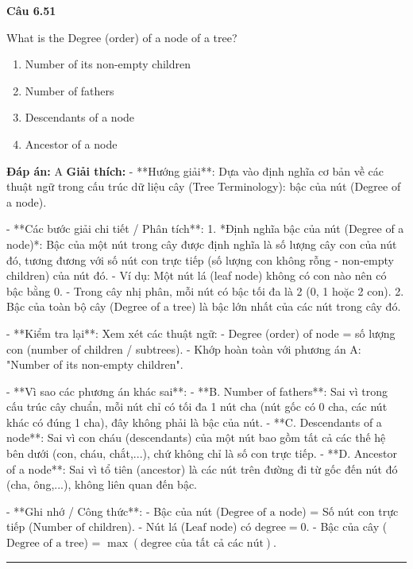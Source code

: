 \documentclass[11pt,a4paper]{article}
\newenvironment{question}[1]{%
  \par\vspace{1em}\noindent\textbf{\large Câu #1}\par\vspace{0.4em}
}{%
  \par\vspace{1em}\hrule\vspace{0.6em}
}
\newenvironment{choices}{%
  \begin{enumerate}[label=\textbf{\Alph*.},leftmargin=2.2em,itemsep=2pt,topsep=3pt]
}{%
  \end{enumerate}
}
\newcommand{\choice}{\item}
\begin{document}
\begin{question}{6.51}
What is the Degree (order) of a node of a tree?
\begin{choices}
\choice Number of its non-empty children
\choice Number of fathers
\choice Descendants of a node
\choice Ancestor of a node
\end{choices}
\textbf{Đáp án:} A
\textbf{Giải thích:} - **Hướng giải**:
  Dựa vào định nghĩa cơ bản về các thuật ngữ trong cấu trúc dữ liệu cây (Tree Terminology): bậc của nút (Degree of a node).

- **Các bước giải chi tiết / Phân tích**:
  1. *Định nghĩa bậc của nút (Degree of a node)*: Bậc của một nút trong cây được định nghĩa là số lượng cây con của nút đó, tương đương với số nút con trực tiếp (số lượng con không rỗng - non-empty children) của nút đó.
     - Ví dụ: Một nút lá (leaf node) không có con nào nên có bậc bằng 0.
     - Trong cây nhị phân, mỗi nút có bậc tối đa là 2 (0, 1 hoặc 2 con).
  2. Bậc của toàn bộ cây (Degree of a tree) là bậc lớn nhất của các nút trong cây đó.

- **Kiểm tra lại**:
  Xem xét các thuật ngữ:
  - Degree (order) of node = số lượng con (number of children / subtrees).
  - Khớp hoàn toàn với phương án A: "Number of its non-empty children".

- **Vì sao các phương án khác sai**:
  - **B. Number of fathers**: Sai vì trong cấu trúc cây chuẩn, mỗi nút chỉ có tối đa 1 nút cha (nút gốc có 0 cha, các nút khác có đúng 1 cha), đây không phải là bậc của nút.
  - **C. Descendants of a node**: Sai vì con cháu (descendants) của một nút bao gồm tất cả các thế hệ bên dưới (con, cháu, chắt,...), chứ không chỉ là số con trực tiếp.
  - **D. Ancestor of a node**: Sai vì tổ tiên (ancestor) là các nút trên đường đi từ gốc đến nút đó (cha, ông,...), không liên quan đến bậc.

- **Ghi nhớ / Công thức**:
  - Bậc của nút (\(\text{Degree of a node}\)) = Số nút con trực tiếp (\(\text{Number of children}\)).
  - Nút lá (\(\text{Leaf node}\)) có \(\text{degree} = 0\).
  - Bậc của cây (\(\text{Degree of a tree}\)) = \(\max(\text{degree của tất cả các nút})\).
\end{question}
\end{document}
